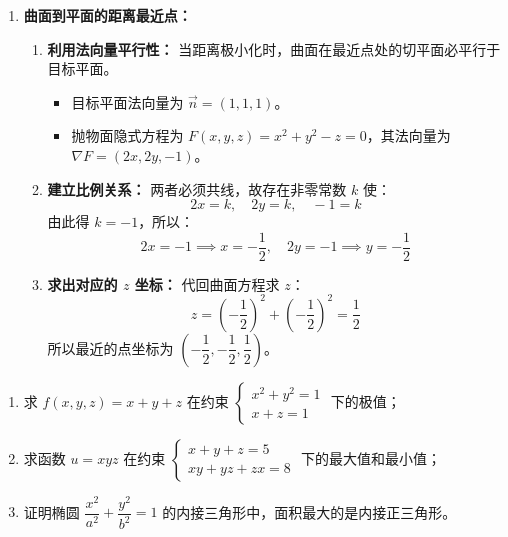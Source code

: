 \documentclass[lang=cn,11pt]{elegantbook}
\begin{document}
\begin{solution}
\begin{enumerate}
  \item[(3)] \textbf{曲面到平面的距离最近点：}
  \begin{enumerate}
    \item \textbf{利用法向量平行性：}
    当距离极小化时，曲面在最近点处的切平面必平行于目标平面。
    \begin{itemize}
      \item 目标平面法向量为 $\vec{n} = (1, 1, 1)$。
      \item 抛物面隐式方程为 $F(x,y,z) = x^2+y^2-z=0$，其法向量为 $\nabla F = (2x, 2y, -1)$。
    \end{itemize}
    \item \textbf{建立比例关系：}
    两者必须共线，故存在非零常数 $k$ 使：
    \[
    2x=k, \quad 2y=k, \quad -1=k
    \]
    由此得 $k=-1$，所以：
    \[
    2x=-1 \implies x=-\frac{1}{2}, \quad 2y=-1 \implies y=-\frac{1}{2}
    \]
    \item \textbf{求出对应的 $z$ 坐标：}
    代回曲面方程求 $z$：
    \[
    z = \left(-\frac{1}{2}\right)^2 + \left(-\frac{1}{2}\right)^2 = \frac{1}{2}
    \]
    所以最近的点坐标为 $\left(-\dfrac{1}{2}, -\dfrac{1}{2}, \dfrac{1}{2}\right)$。
  \end{enumerate}
\end{enumerate}
\end{solution}

\begin{exercise}
\begin{enumerate}
  \item[(1)] 求 $f(x,y,z)=x+y+z$ 在约束 $\begin{cases}x^2+y^2=1\\x+z=1\end{cases}$ 下的极值；
  \item[(2)] 求函数 $u=xyz$ 在约束 $\begin{cases}x+y+z=5\\xy+yz+zx=8\end{cases}$ 下的最大值和最小值；
  \item[(3)] 证明椭圆 $\dfrac{x^2}{a^2}+\dfrac{y^2}{b^2}=1$ 的内接三角形中，面积最大的是内接正三角形。
\end{enumerate}
\end{exercise}
\end{document}
